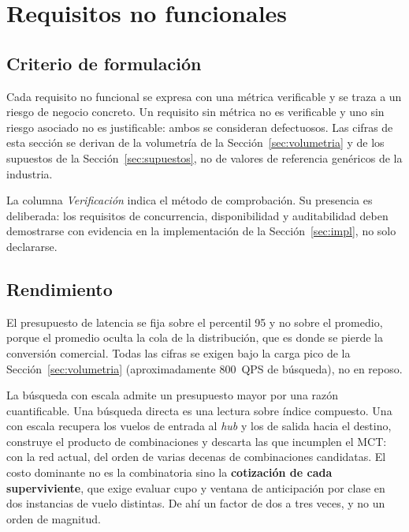 \documentclass[10pt,letterpaper]{article}
\begin{document}
\section{Requisitos no funcionales}
\label{sec:rnf}

\subsection{Criterio de formulación}
Cada requisito no funcional se expresa con una métrica verificable y se traza a un riesgo de negocio concreto. Un requisito sin métrica no es verificable y uno sin riesgo asociado no es justificable: ambos se consideran defectuosos. Las cifras de esta sección se derivan de la volumetría de la Sección~\ref{sec:volumetria} y de los supuestos de la Sección~\ref{sec:supuestos}, no de valores de referencia genéricos de la industria.

La columna \emph{Verificación} indica el método de comprobación. Su presencia es deliberada: los requisitos de concurrencia, disponibilidad y auditabilidad deben demostrarse con evidencia en la implementación de la Sección~\ref{sec:impl}, no solo declararse.

\subsection{Rendimiento}
El presupuesto de latencia se fija sobre el percentil 95 y no sobre el promedio, porque el promedio oculta la cola de la distribución, que es donde se pierde la conversión comercial. Todas las cifras se exigen bajo la carga pico de la Sección~\ref{sec:volumetria} (aproximadamente 800~QPS de búsqueda), no en reposo.

La búsqueda con escala admite un presupuesto mayor por una razón cuantificable. Una búsqueda directa es una lectura sobre índice compuesto. Una con escala recupera los vuelos de entrada al \emph{hub} y los de salida hacia el destino, construye el producto de combinaciones y descarta las que incumplen el MCT: con la red actual, del orden de varias decenas de combinaciones candidatas. El costo dominante no es la combinatoria sino la \textbf{cotización de cada superviviente}, que exige evaluar cupo y ventana de anticipación por clase en dos instancias de vuelo distintas. De ahí un factor de dos a tres veces, y no un orden de magnitud.
\end{document}
